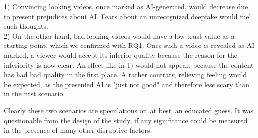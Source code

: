 \documentclass[
  a4paper,  %
  twoside,  %
  bibliography=totoc,
  headsepline,
  cleardoublepage=empty,
  parskip=half,
  draft=false
]{scrbook}
\begin{document}
1) Convincing looking videos, once marked as AI-generated, would decrease due to present prejudices about AI. Fears about an unrecognized deepfake would fuel such thoughts. \\
2) On the other hand, bad looking videos would have a low trust value as a starting point, which we confirmed with RQ1. Once such a video is revealed as AI marked, a viewer would accept its inferior quality because the reason for the inferiority is now clear. An effect like in 1) would not appear, because the content has had bad quality in the first place. A rather contrary, relieving feeling would be expected, as the presented AI is "just not good" and therefore less scary than in the first scenario.

Clearly these two scenarios are speculations or, at best, an educated guess. It was questionable from the design of the study, if any significance could be measured in the presence of many other disruptive factors.
\end{document}
